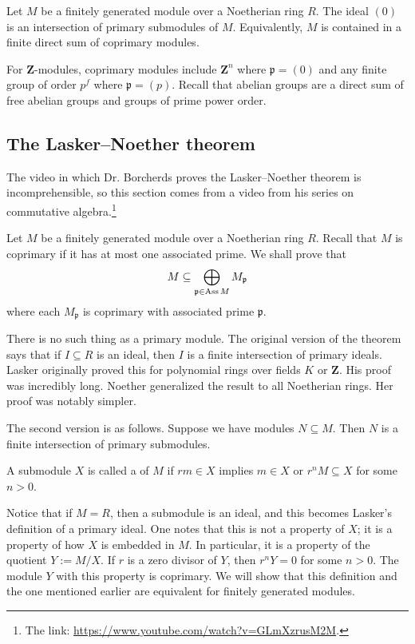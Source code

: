 \documentclass [11 pt, oneside, margin = 1 in] {article}
\begin{document}
\begin{theorem}\label{}\index{}\text{}
Let $M$ be a finitely generated module over a Noetherian ring $R$. The ideal $(0)$ is an intersection of primary submodules of $M$. Equivalently, $M$ is contained in a finite direct sum of coprimary modules.
\end{theorem}

For $\mathbf{Z}$-modules, coprimary modules include $\mathbf{Z}^n$ where $\mathfrak{p}=(0)$ and any finite group of order $p^f$ where $\mathfrak{p} = (p)$. Recall that abelian groups are a direct sum of free abelian groups and groups of prime power order.

\subsection{The Lasker--Noether theorem}
The video in which Dr. Borcherds proves the Lasker--Noether theorem is incomprehensible, so this section comes from a video from his series on commutative algebra.\footnote{The link: \url{https://www.youtube.com/watch?v=GLmXzrusM2M}.}

Let $M$ be a finitely generated module over a Noetherian ring $R$. Recall that $M$ is coprimary if it has at most one associated prime. We shall prove that
\begin{align*}
	M \subseteq \bigoplus_{\mathfrak{p}\in \operatorname{Ass} M} M_{\mathfrak{p}}
\end{align*}
where each $M_{\mathfrak{p}}$ is coprimary with associated prime $ \mathfrak{p}$. 

There is no such thing as a primary module. The original version of the theorem says that if $I\subseteq R$ is an ideal, then $I$ is a finite intersection of primary ideals. Lasker originally proved this for polynomial rings over fields $K$ or $\mathbf{Z}$. His proof was incredibly long. Noether generalized the result to all Noetherian rings. Her proof was notably simpler.

The second version is as follows. Suppose we have modules $N\subseteq M$. Then $N$ is a finite intersection of primary submodules.

\begin{definition}[ ]\label{}\text{}
A submodule $X$ is called a  of $M$ if $rm\in X$ implies $m\in X$ or $r^nM\subseteq X$ for some $n>0$.
\end{definition}

Notice that if $M=R$, then a submodule is an ideal, and this becomes Lasker's definition of a primary ideal. One notes that this is not a property of $X$; it is a property of how $X$ is embedded in $M$. In particular, it is a property of the quotient $Y:= M/X$. If $r$ is a zero divisor of $Y$, then $r^nY=0$ for some $n>0$. The module $Y$ with this property is coprimary. We will show that this definition and the one mentioned earlier are equivalent for finitely generated modules.
\end{document}
